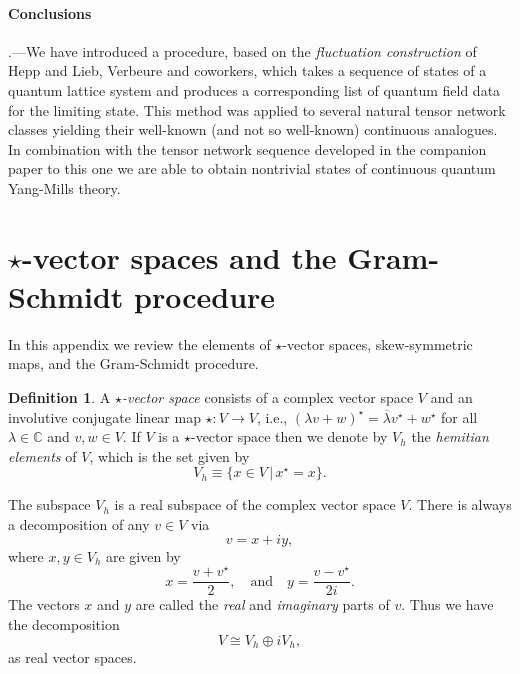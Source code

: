 \documentclass[prl,twocolumn,lengthcheck,superscriptaddress]{revtex4-1}
\theoremstyle{definition}
\newtheorem{definition}{Definition}
\theoremstyle{remark}
\begin{document}
\paragraph*{Conclusions}\hspace{-1em}.---We have introduced a procedure, based on the \emph{fluctuation construction} of Hepp and Lieb, Verbeure and coworkers, which takes a sequence of states of a quantum lattice system and produces a corresponding list of quantum field data for the limiting state. This method was applied to several natural tensor network classes yielding their well-known (and not so well-known) continuous analogues. In combination with the tensor network sequence developed in the companion paper to this one we are able to obtain nontrivial states of continuous quantum Yang-Mills theory.




\widetext
\appendix
\section{$\star$-vector spaces and the Gram-Schmidt procedure}\label{app:ags}
In this appendix we review the elements of $\star$-vector spaces, skew-symmetric maps, and the Gram-Schmidt procedure.

\begin{definition}
	A \emph{$\star$-vector space} consists of a complex vector space $V$ and an involutive conjugate linear map $\star:V\rightarrow V$, i.e., $(\lambda v + w)^\star = \overline{\lambda}v^\star + w^\star$ for all $\lambda \in \mathbb{C}$ and $v,w \in V$. If $V$ is a $\star$-vector space then we denote by $V_h$ the \emph{hemitian elements} of $V$, which is the set given by
	\begin{equation}
		V_h \equiv \{x\in V\,|\, x^\star = x\}.
	\end{equation}
\end{definition}

The subspace $V_h$ is a real subspace of the complex vector space $V$. There is always a decomposition of any $v\in V$ via
\begin{equation}
	v = x+iy, 
\end{equation}
where $x,y \in V_h$ are given by 
\begin{equation}
	x = \frac{v+v^\star}{2},\quad\text{and}\quad y = \frac{v-v^\star}{2i}.
\end{equation} 
The vectors $x$ and $y$ are called the \emph{real} and \emph{imaginary} parts of $v$. Thus we have the decomposition
\begin{equation}
	V \cong V_h\oplus iV_h,
\end{equation}
as real vector spaces.
\end{document}
